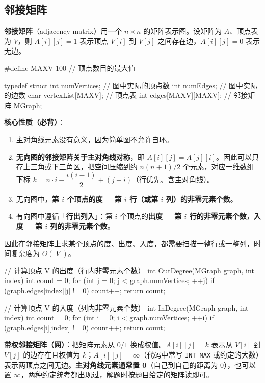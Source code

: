 \documentclass[11pt,openany,UTF8]{ctexbook}
\begin{document}
\subsection{邻接矩阵}

\textbf{邻接矩阵}（adjacency matrix）用一个 $n\times n$ 的矩阵表示图。设矩阵为 $A$、顶点表为 $V$，则 $A[i][j]=1$ 表示顶点 $V[i]$ 到 $V[j]$ 之间存在边，$A[i][j]=0$ 表示无边。

\begin{codebox}
#define MAXV 100          // 顶点数目的最大值

typedef struct {
    int numVertices;          // 图中实际的顶点数
    int numEdges;             // 图中实际的边数
    char vertexList[MAXV];    // 顶点表
    int edges[MAXV][MAXV];    // 邻接矩阵
} MGraph;
\end{codebox}

\textbf{核心性质（必背）}：

\begin{enumerate}
\item 主对角线元素没有意义，因为简单图不允许自环。
\item \textbf{无向图的邻接矩阵关于主对角线对称}，即 $A[i][j]=A[j][i]$。因此可以只存上三角或下三角区，把空间压缩到约 $n(n+1)/2$ 个元素，对应一维数组下标 $k=n\cdot i-\dfrac{i(i-1)}{2}+(j-i)$（行优先、含主对角线）。
\item 无向图中，\textbf{第 $i$ 个顶点的度 = 第 $i$ 行（或第 $i$ 列）的非零元素个数}。
\item 有向图中遵循「\textbf{行出列入}」：第 $i$ 个顶点的\textbf{出度 = 第 $i$ 行的非零元素个数}，\textbf{入度 = 第 $i$ 列的非零元素个数}。
\end{enumerate}
因此在邻接矩阵上求某个顶点的度、出度、入度，都需要扫描一整行或一整列，时间复杂度为 $O(|V|)$。

\begin{codebox}
// 计算顶点 V 的出度（行内非零元素个数）
int OutDegree(MGraph graph, int index) {
    int count = 0;
    for (int j = 0; j < graph.numVertices; ++j) {
        if (graph.edges[index][j] != 0) count++;
    }
    return count;
}

// 计算顶点 V 的入度（列内非零元素个数）
int InDegree(MGraph graph, int index) {
    int count = 0;
    for (int i = 0; i < graph.numVertices; ++i) {
        if (graph.edges[i][index] != 0) count++;
    }
    return count;
}
\end{codebox}

\textbf{带权邻接矩阵（网）}：把矩阵元素从 $0/1$ 换成权值。$A[i][j]=k$ 表示从 $V[i]$ 到 $V[j]$ 的边存在且权值为 $k$；$A[i][j]=\infty$（代码中常写 \texttt{INT\_MAX} 或约定的大数）表示两顶点之间无边。\textbf{主对角线元素通常置 0}（自己到自己的距离为 0），也可以置 $\infty$，两种约定统考都出现过，解题时按题目给定的矩阵读即可。
\end{document}
